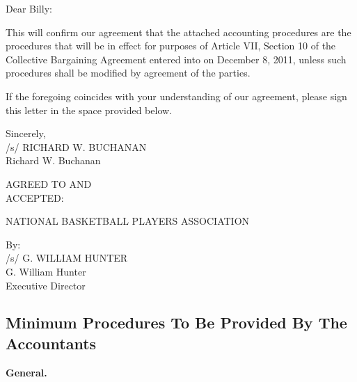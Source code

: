 \documentclass[
]{book}
\begin{document}
Dear Billy:

This will confirm our agreement that the attached accounting procedures are the procedures that will be in effect for purposes of Article VII, Section 10 of the Collective Bargaining Agreement entered into on December 8, 2011, unless such procedures shall be modified by agreement of the parties.

If the foregoing coincides with your understanding of our agreement, please sign this letter in the space provided below.

Sincerely,\\
/s/ RICHARD W. BUCHANAN\\
Richard W. Buchanan

AGREED TO AND\\
ACCEPTED:

NATIONAL BASKETBALL PLAYERS ASSOCIATION

By:\\
/s/ G. WILLIAM HUNTER\\
G. William Hunter\\
Executive Director

\newpage

\hypertarget{minimum-procedures-to-be-provided-by-the-accountants}{%
\subsection{Minimum Procedures To Be Provided By The Accountants}\label{minimum-procedures-to-be-provided-by-the-accountants}}

\textbf{General.}
\end{document}
